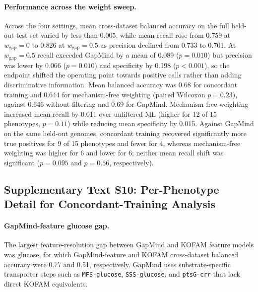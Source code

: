 \paragraph{Performance across the weight sweep.}
Across the four settings, mean cross-dataset balanced accuracy on the full held-out test set varied by less than 0.005, while mean recall rose from 0.759 at $w_{\mathrm{gap}}=0$ to 0.826 at $w_{\mathrm{gap}}=0.5$ as precision declined from 0.733 to 0.701.
At $w_{\mathrm{gap}}=0.5$ recall exceeded GapMind by a mean of 0.089 ($p=0.010$) but precision was lower by 0.066 ($p=0.010$) and specificity by 0.198 ($p<0.001$), so the endpoint shifted the operating point towards positive calls rather than adding discriminative information.
Mean balanced accuracy was 0.68 for concordant training and 0.644 for mechanism-free weighting (paired Wilcoxon $p=0.23$), against 0.646 without filtering and 0.69 for GapMind.
Mechanism-free weighting increased mean recall by 0.011 over unfiltered ML (higher for 12 of 15 phenotypes, $p=0.11$) while reducing mean specificity by 0.015.
Against GapMind on the same held-out genomes, concordant training recovered significantly more true positives for 9 of 15 phenotypes and fewer for 4, whereas mechanism-free weighting was higher for 6 and lower for 6; neither mean recall shift was significant ($p=0.095$ and $p=0.56$, respectively).

\subsection*{Supplementary Text S10: Per-Phenotype Detail for Concordant-Training Analysis}

\paragraph{GapMind-feature glucose gap.}
The largest feature-resolution gap between GapMind and KOFAM feature models was glucose, for which GapMind-feature and KOFAM cross-dataset balanced accuracy were 0.77 and 0.51, respectively.
GapMind uses substrate-specific transporter steps such as \verb|MFS-glucose|, \verb|SSS-glucose|, and \verb|ptsG-crr| that lack direct KOFAM equivalents.

